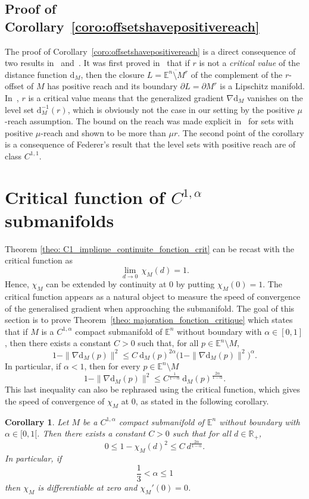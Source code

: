 \documentclass[11pt,reqno,a4paper]{article}%
\newtheorem{corollary}[theorem]{Corollary}
\theoremstyle{definition}
\theoremstyle{remark}
\renewcommand{\leq}{\leqslant}
\renewcommand{\d}{\mathrm{d}}
\newcommand{\R}{\mathbb{R}}
\newcommand{\E}{\mathbb{E}}
\renewcommand{\d}{\mathrm{d}}
\begin{document}
\subsection{Proof of Corollary~\ref{coro:offsetshavepositivereach}}

The proof of Corollary~\ref{coro:offsetshavepositivereach} is a direct consequence of two results in~\cite{fu1985tubular} and~\cite{chazal2007shape}. It was first proved in~\cite[Theorem 4.1]{fu1985tubular} that if $r$ is not a \textit{critical value} of the distance function $\d_M$, then the closure  $L=\overline{\E^n\setminus M^r}$ of the complement of the $r$-offset of $M$ has positive reach and its boundary $\partial L=\partial M^r$ is a Lipschitz manifold. In~\cite{fu1985tubular}, $r$ is a critical value means that the generalized gradient $\nabla\d_M$ vanishes on the level set $\d_M^{-1}(r)$, which is obviously not the case in our setting by the positive $\mu$-reach assumption. The bound on the reach was made explicit in~\cite[Theorem 4.1]{chazal2007shape} for sets with positive $\mu$-reach and shown to be more than $\mu r$. 
The second point of the corollary is a consequence of Federer's result that the level sets with positive reach are of class $C^{1,1}$.

\section{Critical function of $C^{1,\alpha}$  submanifolds}\label{sec:theoremC1alpha}
Theorem \ref{theo: C1_implique_continuite_fonction_crit} can be recast with the critical function as
\[\underset{d \to 0}{\lim} \, \chi_M(d) = 1.\]
Hence, $\chi_M$ can be extended by continuity at 0 by putting $\chi_M(0)=1$.
The critical function  appears as a natural object to measure the speed of convergence of the generalised gradient when approaching the submanifold. 
The goal of this section is to prove Theorem~\ref{theo: majoration_fonction_critique} which states that if
 $M$ is a $C^{1,\alpha}$ compact submanifold of $\E^n$ without boundary with $\alpha \in [0,1]$, 
then there exists a constant $C > 0$ such that, for all $p \in \E^n \setminus M$,
$$  1 - \| \nabla \d_M(p) \|^2  \leq C ~\d_M(p)^{2 \alpha} \Big( 1 - \| \nabla \d_M(p) \|^2 \Big)^{\alpha}.$$
In particular, if $\alpha <1$, then for every $p \in \E^n \setminus M$ 
$$
 1 - \| \nabla \d_M(p) \|^2  \leq C^{\frac{1}{1-\alpha}} ~ \d_M(p)^{\frac{2 \alpha}{1- \alpha}}.
$$
This last inequality can also be rephrased using the critical function, which gives the speed of convergence of $\chi_M$ at $0$, as stated in the following corollary.
\begin{corollary} \label{coro: majoration_fonction_critique}
Let $M$ be a $C^{1,\alpha}$ compact submanifold of $\E^n$ without boundary with $\alpha \in [0,1[$.
Then there exists a constant $C > 0$ such that for all $d \in \R_+$,
$$0 \leq  1 - \chi_M(d)^2 \leq C ~ d^{\frac{2 \alpha}{1- \alpha}}.$$
In particular, if $$ \frac{1}{3} < \alpha \leq  1 $$ then $\chi_M$ is differentiable at zero and $\chi_M'(0) = 0$.
\end{corollary}
\end{document}
